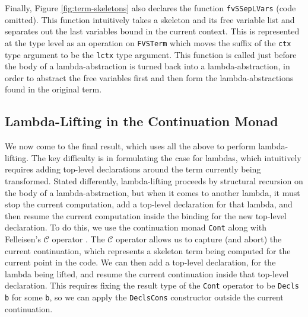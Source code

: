 \documentclass[natbib]{sigplanconf}
\begin{document}
Finally, Figure \ref{fig:term-skeletons} also declares the function
\lstinline{fvSSepLVars} (code omitted). This function intuitively
takes a skeleton and its free variable list and separates out the last
variables bound in the current context. This is represented at the
type level as an operation on \lstinline{FVSTerm} which moves the
suffix of the \lstinline{ctx} type argument to be the \lstinline{lctx}
type argument. This function is called just before the body
of a lambda-abstraction is turned back into a lambda-abstraction,
in order to abstract the free variables first and then form the
lambda-abstractions found in the original term.



\subsection{Lambda-Lifting in the Continuation Monad}
\label{subsec:lambda-lifting}

We now come to the final result, which uses all the above to perform
lambda-lifting. The key difficulty is in formulating the case for
lambdas, which intuitively requires adding top-level declarations
around the term currently being transformed. Stated differently,
lambda-lifting proceeds by structural recursion on the body of a
lambda-abstraction, but when it comes to another lambda, it must stop
the current computation, add a top-level declaration for that lambda,
and then resume the current computation inside the binding for the new
top-level declaration. To do this, we use the continuation monad
\lstinline{Cont} along with Felleisen's $\mathcal{C}$ operator
\cite{felleisen87}.  The $\mathcal{C}$ operator allows us to capture
(and abort) the current continuation, which represents a skeleton term
being computed for the current point in the code. We can then add a
top-level declaration, for the lambda being lifted, and resume the
current continuation inside that top-level declaration.  This requires
fixing the result type of the \lstinline{Cont} operator to be
\lstinline{Decls b} for some \lstinline{b}, so we can apply the
\lstinline{DeclsCons} constructor outside the current continuation.
\end{document}
